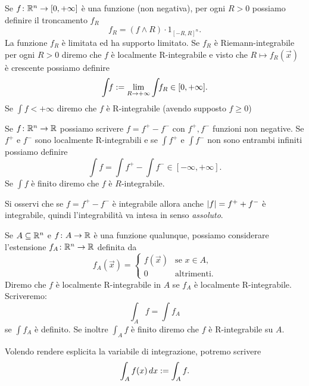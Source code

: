 \begin{definition}
Se $f\colon {\mathbb R}^n \to [0,+\infty]$ è una funzione (non negativa), per ogni $R>0$ 
possiamo definire il troncamento $f_R$ 
\[
  f_R = (f \wedge R) \cdot 1_{[-R,R]^n}.
\]
La funzione $f_R$ è limitata ed ha supporto limitato.
Se $f_R$ è Riemann-integrabile per ogni $R>0$ diremo che $f$ è localmente R-integrabile 
e visto che $R\mapsto f_R(\vec x)$ è crescente possiamo definire
\[
 \int\!\! f := \lim_{R\to+\infty} \int\!\! f_R \in [0,+\infty].
\]
Se $\int\!\! f<+\infty$ diremo che $f$ è R-integrabile (avendo supposto $f\ge 0$)


Se $f\colon {\mathbb R}^n\to {\mathbb R}$ possiamo scrivere $f= f^+-f^-$ con $f^+,f^-$ funzioni non negative.
Se $f^+$ e $f^-$ sono localmente R-integrabili e se 
$\int\!\! f^+$ e $\int\!\! f^-$ non sono entrambi infiniti possiamo definire 
\[
  \int\!\! f = \int\!\! f^+ - \int\!\! f^- \in [-\infty,+\infty].
\]
Se $\int\!\! f$ è finito diremo che $f$ è $R$-integrabile.

Si osservi che se $f=f^+ - f^-$ è integrabile allora anche 
${\left|f\right|} = f^+ + f^-$ è integrabile, quindi l'integrabilità va intesa 
in senso \emph{assoluto}.
\end{definition}

\begin{definition}
Se $A\subseteq {\mathbb R}^n$ e $f\colon A \to {\mathbb R}$
è una funzione qualunque, possiamo considerare l'estensione 
$f_A\colon {\mathbb R}^n \to {\mathbb R}$ definita da 
\[
 f_A(\vec x) = \begin{cases}
    f(\vec x) & \text{se $x\in A$,}\\
    0 & \text{altrimenti.}
 \end{cases}
\]
Diremo che $f$ è localmente R-integrabile in $A$ se $f_A$ 
è localmente R-integrabile.
Scriveremo:
\[
 \int_A f = \int\!\! f_A
\]
se $\int f_A$ è definito.
Se inoltre $\int_A f$ è finito diremo che $f$ è R-integrabile
su $A$.

Volendo rendere esplicita la variabile di integrazione, potremo 
scrivere 
\[
  \int_A f(x)\, dx := \int_A f.
\]
\end{definition}

